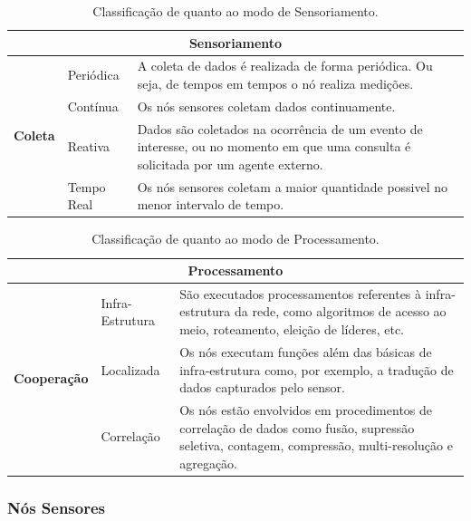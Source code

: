 \begin{table}[h!]
\centering
\small
	\begin{tabular}{ | l | l | p{8.5cm} | }
		\hline
		\multicolumn{3}{|c|}{\textbf{Sensoriamento}} \\
		\hline

		\multirow{4}{*}{\textbf{Coleta}}
				 & Periódica & A coleta de dados é realizada de forma periódica. Ou seja, de tempos em tempos o nó realiza medições. \\ 
				\cline{2-3}
			       	& Contínua &  Os nós sensores coletam dados continuamente.  \\
				\cline{2-3}
				 & Reativa & Dados são coletados na ocorrência de um evento de interesse, ou no momento em que uma consulta é solicitada por um agente externo. \\ 
				\cline{2-3}
			       	& Tempo Real & Os nós sensores coletam a maior quantidade possivel no menor intervalo de tempo.  \\
		\hline
	\end{tabular}

	\caption{Classificação de \rssfs quanto ao modo de Sensoriamento.}
	\label{tbl:sensoriamento}
\end{table}


\begin{table}[h!]
\centering
\small
	\begin{tabular}{ | l | l | p{7.2cm} | }
		\hline
		\multicolumn{3}{|c|}{\textbf{Processamento}} \\
		\hline

		\multirow{3}{*}{\textbf{Cooperação}}
				 & Infra-Estrutura & São executados processamentos referentes à infra-estrutura da rede, como algoritmos de acesso ao meio, roteamento, eleição de líderes, etc. \\ 
				\cline{2-3}
			       	& Localizada &  Os nós executam funções além das básicas de infra-estrutura como, por exemplo, a tradução de dados capturados pelo sensor.  \\
				\cline{2-3}
				& Correlação & Os nós estão envolvidos em procedimentos de correlação de dados como fusão, supressão seletiva, contagem, compressão, multi-resolução e agregação. \\
		\hline
	\end{tabular}

	\caption{Classificação de \rssfs quanto ao modo de Processamento.}
	\label{tbl:processamento}
\end{table}

\subsubsection{Nós Sensores}

